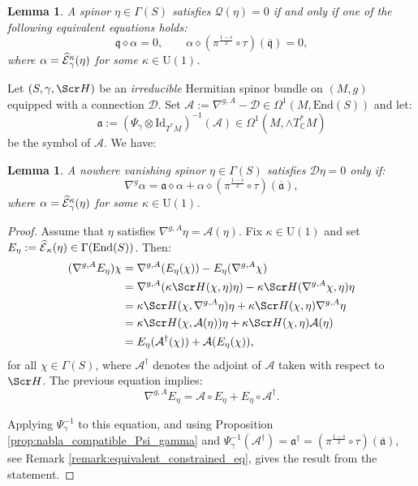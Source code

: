 \documentclass[10pt,a4paper,twoside,reqno]{amsart}
\theoremstyle{plain}
\newtheorem{lemma}[thm]{Lemma}
\theoremstyle{definition}
\theoremstyle{remark}
\newcommand{\End}{\mathrm{End}}
\def\C{\mathbb{C}}
\def\cQ{\mathcal{Q}}
\def\Id{\mathrm{Id}}
\def\fra{\mathfrak{a}}
\def\frq{\mathfrak{q}}
\def\scS{\Scr H}
\def\U{\mathrm{U}}
\def\cD{\mathcal{D}}
\def\cA{\mathcal{A}}
\def\hcE{\smash{\widehat{\mathcal{E}}}}
\begin{document}
\begin{lemma}
\label{lemma:constrained_spinor_as_section}
A spinor $\eta\in\Gamma(S)$ satisfies $\cQ(\eta)=0$ if and only if one of the following equivalent equations holds: $$\frq\diamond\alpha=0,\qquad\alpha\diamond(\pi^{\frac{1-s}{2}}\circ\tau)(\overline{\frq})=0,$$ where $\alpha=\hcE^\kappa_\gamma(\eta)$ for some $\kappa\in\U(1)$.
\end{lemma}

Let $(S,\gamma,\scS)$ be an \emph{irreducible} Hermitian spinor bundle on $(M,g)$ equipped with a connection $\cD$. Set $\cA:=\nabla^{g,A}-\cD\in\Omega^1(M,\End(S))$ and let: 
\begin{equation*}
\fra:=(\Psi_\gamma\otimes\Id_{T^*M})^{-1}(\cA)\in\Omega^1(M,\wedge T^*_\C M)    
\end{equation*}
be the symbol of $\cA$. We have:

\begin{lemma}
\label{lemma:nabla_square_alpha}
A nowhere vanishing spinor $\eta\in\Gamma(S)$ satisfies $\cD\eta=0$ only if: $$\nabla^g\alpha=\fra\diamond\alpha+\alpha\diamond(\pi^{\frac{1-s}{2}}\circ\tau)(\overline{\fra}),$$ where $\alpha=\hcE^\kappa_\gamma(\eta)$ for some $\kappa\in\U(1)$.
\end{lemma}

\begin{proof}
    Assume that $\eta$ satisfies $\nabla^{g,A}\eta=\cA(\eta)$. Fix $\kappa\in\U(1)$ and set $E_\eta:=\hcE_\kappa(\eta)\in\Gamma(\End(S))$. Then: \begin{align*}
        (\nabla^{g,A}E_\eta)\chi&=\nabla^{g,A}(E_\eta(\chi))-E_\eta(\nabla^{g,A}\chi)\\
        &=\nabla^{g,A}(\kappa\scS(\chi,\eta)\eta)-\kappa\scS(\nabla^{g,A}\chi,\eta)\eta\\
        &=\kappa\scS(\chi,\nabla^{g,A}\eta)\eta+\kappa\scS(\chi,\eta)\nabla^{g,A}\eta\\
        &=\kappa\scS(\chi,\cA(\eta))\eta+\kappa\scS(\chi,\eta)\cA(\eta)\\
        &=E_\eta(\cA^\dagger(\chi))+\cA(E_\eta(\chi)),
    \end{align*} for all $\chi\in\Gamma(S)$, where $\cA^\dagger$ denotes the adjoint of $\cA$ taken with respect to $\scS$. The previous equation implies: $$\nabla^{g,A}E_\eta=\cA\circ E_\eta+E_\eta\circ\cA^\dagger.$$
    
    Applying $\Psi_\gamma^{-1}$ to this equation, and using Proposition \ref{prop:nabla_compatible_Psi_gamma} and $\Psi_\gamma^{-1}(\cA^\dagger)=\fra^\dagger=(\pi^{\frac{1-s}{2}}\circ\tau)(\overline{\fra})$, see Remark \ref{remark:equivalent_constrained_eq}, gives the result from the statement.
\end{proof}
\end{document}
